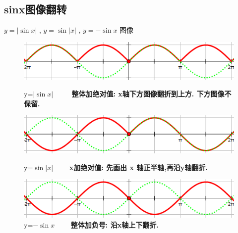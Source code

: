 \documentclass[hyperref, UTF8,11pt,a4paper]{ctexart} %
\begin{document}
\subsection {sinx图像翻转}
$y=|\sin x|$ , $y=\sin |x|$ , $y=-\sin x$ 图像 \\
\begin{figure}[htbp]
	\begin{center}
		\includegraphics[scale=0.6]  {pic/sanjiaohanshu/abs(sin(x)).png}
		\caption{y=$|\sin x|$ $\qquad$ \textbf{整体加绝对值: x轴下方图像翻折到上方. 下方图像不保留.}  }
		\includegraphics[scale=0.6]  {pic/sanjiaohanshu/sin(abs(x)).png}
		\caption{y=$\sin |x|$ $\qquad$\textbf{x加绝对值: 先画出 x 轴正半轴,再沿y轴翻折.}}
		\includegraphics[scale=0.6]  {pic/sanjiaohanshu/-sinx.png}
		\caption{y=$-\sin x$ $\qquad$\textbf{整体加负号: 沿x轴上下翻折.}}
	\end{center}

\end{figure}

\end{document}
